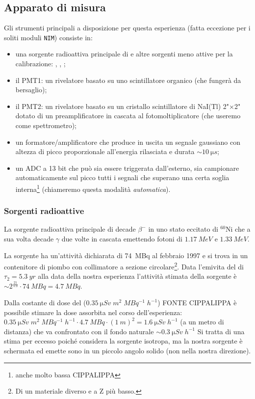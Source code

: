\subsection{Apparato di misura}

Gli strumenti principali a disposizione per questa esperienza (fatta eccezione per i soliti moduli \texttt{NIM}) consiste in:
\begin{itemize}
	\item una sorgente radioattiva principale di \co\; e altre sorgenti meno attive per la calibrazione: \cs, \na, \am;
	\item il PMT1: un rivelatore basato su uno scintillatore organico (che fungerà da bersaglio);
	\item il PMT2: un rivelatore basato su un cristallo scintillatore di NaI(Tl) 2"$\times$2" dotato di un preamplificatore in cascata al fotomoltiplicatore (che useremo come spettrometro);
	\item un formatore/amplificatore che produce in uscita un segnale gaussiano con altezza di picco proporzionale all'energia rilasciata e durata $\sim \SI{10}{\micro s}$;
	\item un ADC a 13 bit che può sia essere triggerata dall'esterno, sia campionare automaticamente sul picco tutti i segnali che superano una certa soglia interna\footnote{anche molto bassa CIPPALIPPA} (chiameremo questa modalità \emph{automatica}).
\end{itemize}

\subsubsection{Sorgenti radioattive}
La sorgente radioattiva principale di \co\; decade $\beta^-$ in uno stato eccitato di $^60$Ni che a sua volta decade $\gamma$ due volte in cascata emettendo fotoni di $\SI{1.17}{MeV}$ e $\SI{1.33}{MeV}$.

La sorgente ha un'attività dichiarata di \SI{74}{MBq} al febbraio 1997 e si trova in un contenitore di piombo con collimatore a sezione circolare\footnote{Di un materiale diverso e a Z più basso.}. 
Data l'emivita del \co\; di $\tau_2 = \SI{5.3}{yr}$ alla data della nostra esperienza l'attività stimata della sorgente è $\sim 2^{\frac{21}{5.3}} \cdot \SI{74}{MBq} = \SI{4.7}{MBq}$.

Dalla costante di dose del \co\;  ($\SI{0.35}{\micro Sv\;m^2\;MBq^{-1}\;h^{-1}}$) FONTE CIPPALIPPA è possibile stimare la dose assorbita nel corso dell'esperienza: $\SI{0.35}{\micro Sv\;m^2\;MBq^{-1}\;h^{-1}} \cdot \SI{4.7}{MBq} \cdot (\SI{1}{m})^2= \SI{1.6}{\micro Sv\;h^{-1}}$ (a un metro di distanza) che va confrontato con il fondo naturale $\sim\SI{0.3}{\micro Sv\;h^{-1}}$ Si tratta di una stima per eccesso poiché considera la sorgente isotropa, ma la nostra sorgente è schermata ed emette sono in un piccolo angolo solido (non nella nostra direzione).

